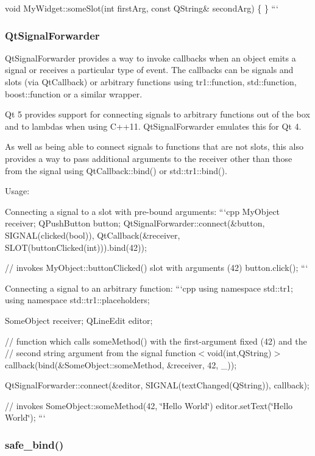 void My\-Widget\-::some\-Slot(int first\-Arg, const Q\-String\& second\-Arg) \{ \} ```

\subsubsection*{Qt\-Signal\-Forwarder}

Qt\-Signal\-Forwarder provides a way to invoke callbacks when an object emits a signal or receives a particular type of event. The callbacks can be signals and slots (via {\ttfamily Qt\-Callback}) or arbitrary functions using {\ttfamily tr1\-::function}, {\ttfamily std\-::function}, {\ttfamily boost\-::function} or a similar wrapper.

Qt 5 provides support for connecting signals to arbitrary functions out of the box and to lambdas when using C++11. Qt\-Signal\-Forwarder emulates this for Qt 4.

As well as being able to connect signals to functions that are not slots, this also provides a way to pass additional arguments to the receiver other than those from the signal using {\ttfamily Qt\-Callback\-::bind()} or {\ttfamily std\-::tr1\-::bind()}.

Usage\-:

Connecting a signal to a slot with pre-\/bound arguments\-: ```cpp My\-Object receiver; Q\-Push\-Button button; Qt\-Signal\-Forwarder\-::connect(\&button, S\-I\-G\-N\-A\-L(clicked(bool)), Qt\-Callback(\&receiver, S\-L\-O\-T(button\-Clicked(int))).bind(42));

// invokes My\-Object\-::button\-Clicked() slot with arguments (42) button.\-click(); ```

Connecting a signal to an arbitrary function\-: ```cpp using namespace std\-::tr1; using namespace std\-::tr1\-::placeholders;

Some\-Object receiver; Q\-Line\-Edit editor;

// function which calls some\-Method() with the first-\/argument fixed (42) and the // second string argument from the signal function$<$void(int,\-Q\-String)$>$ callback(bind(\&\-Some\-Object\-::some\-Method, \&receiver, 42, \-\_));

Qt\-Signal\-Forwarder\-::connect(\&editor, S\-I\-G\-N\-A\-L(text\-Changed(\-Q\-String)), callback);

// invokes Some\-Object\-::some\-Method(42, \char`\"{}\-Hello World\char`\"{}) editor.\-set\-Text(\char`\"{}\-Hello World\char`\"{}); ```

\subsubsection*{safe\-\_\-bind()}


